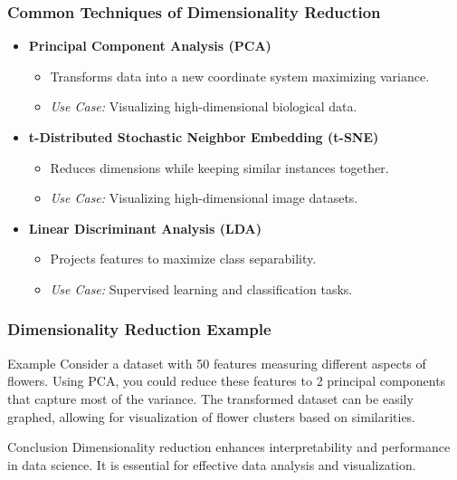 \documentclass[aspectratio=169]{beamer}
\begin{document}
\begin{frame}[fragile]
    \frametitle{Common Techniques of Dimensionality Reduction}
    \begin{itemize}
        \item \textbf{Principal Component Analysis (PCA)}
        \begin{itemize}
            \item Transforms data into a new coordinate system maximizing variance.
            \item \textit{Use Case:} Visualizing high-dimensional biological data.
        \end{itemize}

        \item \textbf{t-Distributed Stochastic Neighbor Embedding (t-SNE)}
        \begin{itemize}
            \item Reduces dimensions while keeping similar instances together.
            \item \textit{Use Case:} Visualizing high-dimensional image datasets.
        \end{itemize}

        \item \textbf{Linear Discriminant Analysis (LDA)}
        \begin{itemize}
            \item Projects features to maximize class separability.
            \item \textit{Use Case:} Supervised learning and classification tasks.
        \end{itemize}
    \end{itemize}
\end{frame}

\begin{frame}[fragile]
    \frametitle{Dimensionality Reduction Example}
    \begin{block}{Example}
        Consider a dataset with 50 features measuring different aspects of flowers. Using PCA, you could reduce these features to 2 principal components that capture most of the variance. The transformed dataset can be easily graphed, allowing for visualization of flower clusters based on similarities.
    \end{block}
    
    \begin{block}{Conclusion}
        Dimensionality reduction enhances interpretability and performance in data science. It is essential for effective data analysis and visualization. 
    \end{block}
\end{frame}
\end{document}
